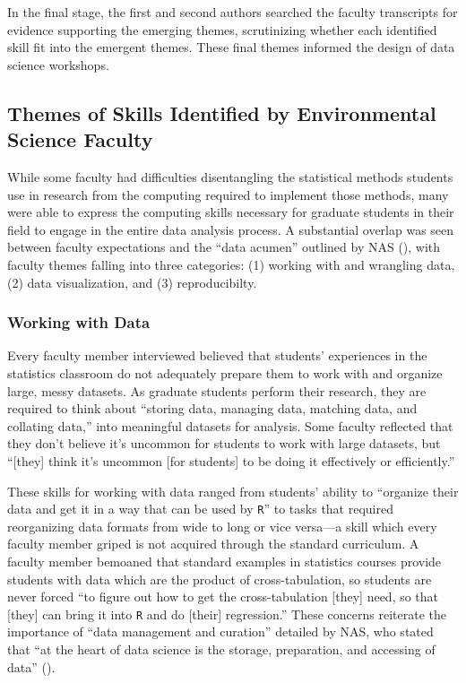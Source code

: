 \documentclass[12pt]{article}
\begin{document}

\quad In the final stage, the first and second authors searched the faculty
transcripts for evidence supporting the emerging themes, scrutinizing whether
each identified skill fit into the emergent themes. 
These final themes informed the design of data science workshops. 

\subsection{Themes of Skills Identified by Environmental Science Faculty}

\noindent While some faculty had difficulties disentangling the statistical
methods students use in research from the computing required to implement those
methods, many were able to express the computing skills necessary for graduate
students in their field to engage in the entire data analysis process. A
substantial overlap was seen between faculty expectations and the ``data
acumen'' outlined by NAS (\citeyear{nas}), with faculty themes falling into
three categories: (1) working with and wrangling data, (2) data visualization,
and (3) reproducibilty. 

\subsubsection{Working with Data}  

\noindent Every faculty member interviewed believed that students' experiences in
the statistics classroom do not adequately prepare them to work with and
organize large, messy datasets. As graduate students perform their research,
they are required to think about ``storing data, managing data, matching
data, and collating data,'' into meaningful datasets for analysis. Some 
faculty reflected that they don't believe it's uncommon for students to work
with large datasets, but ``[they] think it's uncommon [for students] to be doing
it effectively or efficiently.'' 

\quad These skills for working with data ranged from students' ability to 
``organize their data and get it in a way that can be used by \texttt{R}'' to 
tasks that required reorganizing data formats from wide to long or vice 
versa---a skill which every faculty member griped is not acquired through the
standard curriculum. A faculty member bemoaned that standard examples in
statistics courses provide students with data which are the product
of cross-tabulation, so students are never forced ``to figure out how to get the
cross-tabulation [they] need, so that [they] can bring it into \texttt{R} and do
[their] regression.'' These concerns reiterate the importance of ``data
management and curation'' detailed by NAS, who stated that ``at the heart of
data science is the storage, preparation, and accessing of data'' 
(\citeyear[p.\ 26]{nas}). 
\end{document}
